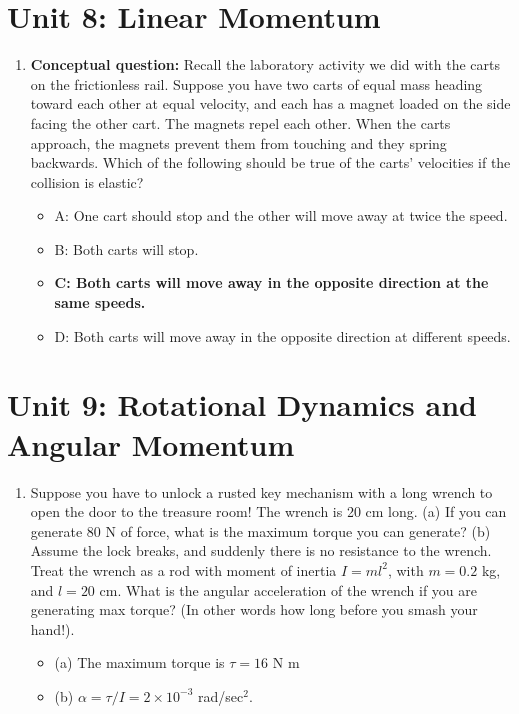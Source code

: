 \documentclass[10pt]{article}
\begin{document}
\section{Unit 8: Linear Momentum}
\begin{enumerate}
\item \textbf{Conceptual question:} Recall the laboratory activity we did with the carts on the frictionless rail. Suppose you
have two carts of equal mass heading toward each other at equal velocity, and each has a magnet loaded on the side
facing the other cart. The magnets repel each other. When the carts approach, the magnets prevent them from
touching and they spring backwards. Which of the following should be true of the carts’ velocities if the collision is
elastic?
\begin{itemize}
\item A: One cart should stop and the other will move away at twice the speed.
\item B: Both carts will stop.
\item \textbf{C: Both carts will move away in the opposite direction at the same speeds.}
\item D: Both carts will move away in the opposite direction at different speeds.
\end{itemize}
\end{enumerate}

\section{Unit 9: Rotational Dynamics and Angular Momentum}
\begin{enumerate}
\item Suppose you have to unlock a rusted key mechanism with a long wrench to open the door to the treasure room!  The wrench is 20 cm long.  (a) If you can generate 80 N of force, what is the maximum torque you can generate?  (b) Assume the lock breaks, and suddenly there is no resistance to the wrench.  Treat the wrench as a rod with moment of inertia $I = m l^2$, with $m = 0.2$ kg, and $l = 20$ cm.  What is the angular acceleration of the wrench if you are generating max torque?  (In other words how long before you smash your hand!).
\begin{itemize}
\item (a) The maximum torque is $\tau = 16$ N m
\item (b) $\alpha = \tau / I = 2 \times 10^{-3}$ rad/sec$^2$.
\end{itemize}
\end{enumerate}
\end{document}
